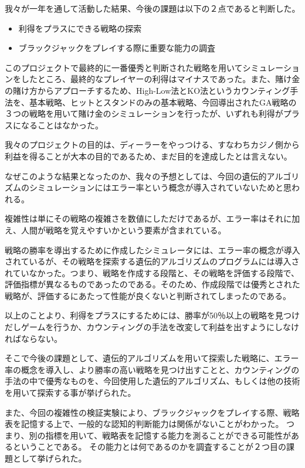 我々が一年を通して活動した結果、今後の課題は以下の２点であると判断した。

\begin{itemize}
\item 利得をプラスにできる戦略の探索
\item ブラックジャックをプレイする際に重要な能力の調査
\end{itemize}

このプロジェクトで最終的に一番優秀と判断された戦略を用いてシミュレーションをしたところ、最終的なプレイヤーの利得はマイナスであった。また、賭け金の賭け方からアプローチするため、High-Low法とKO法というカウンティング手法を、基本戦略、ヒットとスタンドのみの基本戦略、今回導出されたGA戦略の３つの戦略を用いて賭け金のシミュレーションを行ったが、いずれも利得がプラスになることはなかった。

我々のプロジェクトの目的は、ディーラーをやっつける、すなわちカジノ側から利益を得ることが大本の目的であるため、まだ目的を達成したとは言えない。

なぜこのような結果となったのか、我々の予想としては、今回の遺伝的アルゴリズムのシミュレーションにはエラー率という概念が導入されていないためと思われる。

複雑性は単にその戦略の複雑さを数値にしただけであるが、エラー率はそれに加え、人間が戦略を覚えやすいかという要素が含まれている。

戦略の勝率を導出するために作成したシミュレータには、エラー率の概念が導入されているが、その戦略を探索する遺伝的アルゴリズムのプログラムには導入されていなかった。つまり、戦略を作成する段階と、その戦略を評価する段階で、評価指標が異なるものであったのである。そのため、作成段階では優秀とされた戦略が、評価するにあたって性能が良くないと判断されてしまったのである。

以上のことより、利得をプラスにするためには、勝率が50％以上の戦略を見つけだしゲームを行うか、カウンティングの手法を改変して利益を出すようにしなければならない。

そこで今後の課題として、遺伝的アルゴリズムを用いて探索した戦略に、エラー率の概念を導入し、より勝率の高い戦略を見つけ出すことと、カウンティングの手法の中で優秀なものを、今回使用した遺伝的アルゴリズム、もしくは他の技術を用いて探索する事が挙げられた。

また、今回の複雑性の検証実験により、ブラックジャックをプレイする際、戦略表を記憶する上で、一般的な認知的判断能力は関係がないことがわかった。
つまり、別の指標を用いて、戦略表を記憶する能力を測ることができる可能性があるということである。
その能力とは何であるのかを調査することが２つ目の課題として挙げられた。

